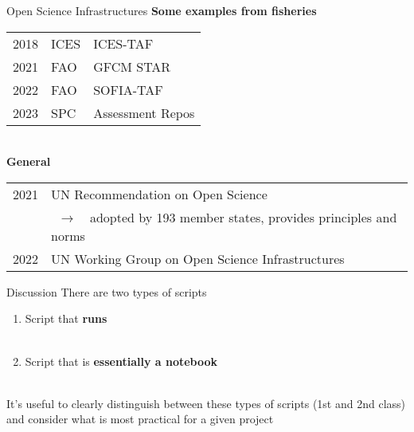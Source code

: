 \documentclass[aspectratio=169]{beamer}
\newcommand\arrow{~$\rightarrow$~~}
\begin{document}
\begin{frame}{Open Science Infrastructures}
  \textbf{\blue Some examples from fisheries}\\[1ex]
  \begin{tabular}{lll}
    2018 & ICES & ICES-TAF \\[0.5ex]
    2021 & FAO  & GFCM STAR\\[0.5ex]
    2022 & FAO  & SOFIA-TAF\\[0.5ex]
    2023 & SPC  & Assessment Repos\\[5ex]
  \end{tabular}\\
  \textbf{\green\bf General}\\[1ex]
  \begin{tabular}{ll}
    2021 & UN Recommendation on Open Science\\[0.5ex]
    ~    & \arrow adopted by 193 member states, provides principles and
           norms\\[0.5ex]
    2022 & UN Working Group on Open Science Infrastructures\\
  \end{tabular}
\end{frame}


\begin{frame}{Discussion}
  There are two types of scripts\\[2ex]
  \begin{enumerate}
    \item Script that {\bf runs}\\[0.5ex]
    \\[2ex]
    \item Script that is {\bf essentially a notebook}\\[0.5ex]
    \\[3ex]
  \end{enumerate}
  It's useful to clearly distinguish between these types of scripts (1st and 2nd
  class)\\[0.2ex]
  and consider what is most practical for a given project\\[1ex]
\end{frame}
\end{document}
